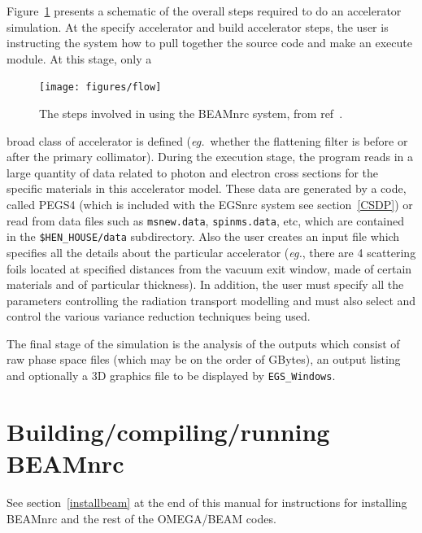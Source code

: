 \documentclass[12pt,twoside]{article}
\newcommand{\eg}{{\em eg.}}
\begin{document}
Figure~\ref{fig_flow} presents a schematic of the overall steps required
to do an accelerator simulation.  At the {\sf specify} accelerator and {\sf
build} accelerator steps, the user is instructing the system how to pull
together the source code and make an execute module.  At this stage, only a
 
\begin{figure}[htbp]
\begin{center}
\leavevmode
\mbox{}\hspace{0cm}
\texttt{[image: figures/flow]}
\caption[Steps involved in using the BEAMnrc code]
{The steps involved in using the BEAMnrc system, from ref~\cite{Ro95}.}
\label{fig_flow}
\end{center}
\end{figure}
broad class of accelerator is defined (\eg\ whether the flattening
filter is before or after the primary collimator).  During the execution
stage, the program reads in a large quantity of data related to photon
and electron cross sections for the specific materials in this
accelerator model. These data are generated by a code,
called PEGS4 (which is included with the EGSnrc system
see section~\ref{CSDP}) or read from data files such as
{\tt msnew.data}, {\tt spinms.data}, etc,  which are contained in the
{\tt \$HEN\_HOUSE/data} subdirectory. Also the user creates an input file
which specifies
all the details about the particular accelerator (\eg, there are 4 scattering
foils located at specified distances from the vacuum exit window,
made of certain materials and of particular thickness).  In addition, the user
must specify all the parameters controlling the radiation transport
modelling and must also select and control the various variance
reduction techniques being used.

The final stage of the simulation is the analysis of the outputs which
consist of raw phase space files (which may be on the order of GBytes),
an output listing and optionally a 3D graphics file to be displayed
by {\tt EGS\_Windows}\cite{TR99a}.

\section{Building/compiling/running BEAMnrc}

See section~\ref{installbeam} at the end of this manual for
instructions for installing BEAMnrc and the rest of
the OMEGA/BEAM codes.
\end{document}
